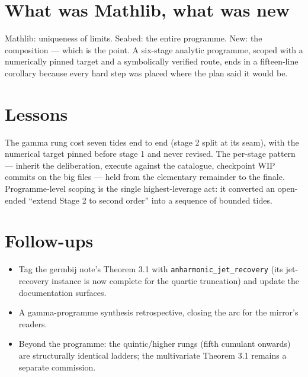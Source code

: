 \documentclass[11pt]{article}
\begin{document}
\section{What was Mathlib, what was new}

Mathlib: uniqueness of limits. Seabed: the entire programme. New: the
composition --- which is the point. A six-stage analytic programme,
scoped with a numerically pinned target and a symbolically verified
route, ends in a fifteen-line corollary because every hard step was
placed where the plan said it would be.

\section{Lessons}

The gamma rung cost seven tides end to end (stage 2 split at its seam),
with the numerical target pinned before stage 1 and never revised. The
per-stage pattern --- inherit the deliberation, execute against the
catalogue, checkpoint WIP commits on the big files --- held from the
elementary remainder to the finale. Programme-level scoping is the
single highest-leverage act: it converted an open-ended ``extend
Stage 2 to second order'' into a sequence of bounded tides.

\section{Follow-ups}

\begin{itemize}
\item Tag the germbij note's Theorem 3.1 with
\texttt{anharmonic\_jet\_recovery} (its jet-recovery instance is now
complete for the quartic truncation) and update the documentation
surfaces.
\item A gamma-programme synthesis retrospective, closing the arc for
the mirror's readers.
\item Beyond the programme: the quintic/higher rungs (fifth cumulant
onwards) are structurally identical ladders; the multivariate Theorem
3.1 remains a separate commission.
\end{itemize}
\end{document}
